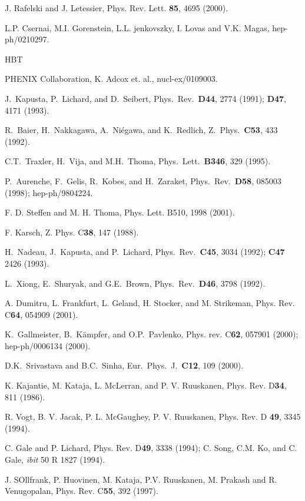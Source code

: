 \documentclass[aps,prc,preprint,superscriptaddress,showpacs,showkeys]{revtex4-1}
\begin{document}
\begin{thebibliography}{00}
 J. Rafelski and J. Letessier, Phys. Rev. Lett. {\bf 85},
                  4695 (2000).

 L.P. Csernai, M.I. Gorenstein, L.L. jenkovszky, 
                        I. Lovas and V.K. Magas, hep-ph/0210297.

 HBT

 PHENIX Collaboration, K. Adcox et. al., 
                    nucl-ex/0109003.

 J.\ Kapusta, P.\ Lichard, and D.\ Seibert, 
   Phys.\ Rev.\ {\bf D44}, 2774 (1991); {\bf D47}, 4171 (1993). 

 R.\ Baier, H.\ Nakkagawa, A.\ Ni\'{e}gawa, and
K.\ Redlich, Z.\ Phys.\ {\bf C53}, 433 (1992).

 C.T.\ Traxler, H.\ Vija, and M.H.\ Thoma,
Phys.\ Lett.\ {\bf B346}, 329 (1995).
  
 P.\ Aurenche, F.\ Gelis, R.\ Kobes, and H.\ Zaraket,
  Phys.\ Rev.\ {\bf D58}, 085003 (1998); \mbox{hep-ph/9804224}. 

 F. D. Steffen and M. H. Thoma, Phys. Lett. B510, 
                  1998 (2001).
                  
 F. Karsch, Z. Phys. C{\bf 38}, 147 (1988).
  
 H.\ Nadeau, J.\ Kapusta, and P.\ Lichard,
Phys.\ Rev.\ {\bf C45}, 3034 (1992); {\bf C47} 2426 (1993).

 L.\ Xiong, E.\ Shuryak, and G.E.\ Brown, Phys.\
Rev.\ {\bf D46}, 3798 (1992).

 A. Dumitru, L. Frankfurt, L. Geland, H. Stocker, and
               M. Strikeman, Phys. Rev. C{\bf 64}, 054909 (2001).

 K.\ Gallmeister, B.\ K\"ampfer, and O.P.\ Pavlenko, 
            Phys. rev. C{\bf 62}, 057901 (2000); hep-ph/0006134 (2000).

 D.K.\ Srivastava and B.C.\ Sinha,
             Eur.\ Phys.\ J.\ {\bf C12}, 109 (2000).

 K. Kajantie, M. Kataja, L. McLerran, and P. V. Ruuskanen,
               Phys. Rev. D{\bf 34}, 811 (1986).

 R. Vogt, B. V. Jacak, P. L. McGaughey, P. V. Ruuskanen,
          Phys. Rev. D {\bf 49}, 3345 (1994).
          
 C. Gale and P. Lichard, Phys. Rev. D{\bf 49}, 3338 (1994);
               C. Song, C.M. Ko, and C. Gale, {\it ibit} 50 R 1827 (1994).
               
 J. SOllfrank, P. Huovinen, M. Kataja, P.V. Ruuskanen,
             M. Prakash and R. Venugopalan, 
             Phys. Rev. C{\bf 55}, 392 (1997).

\end{thebibliography}
\end{document}
